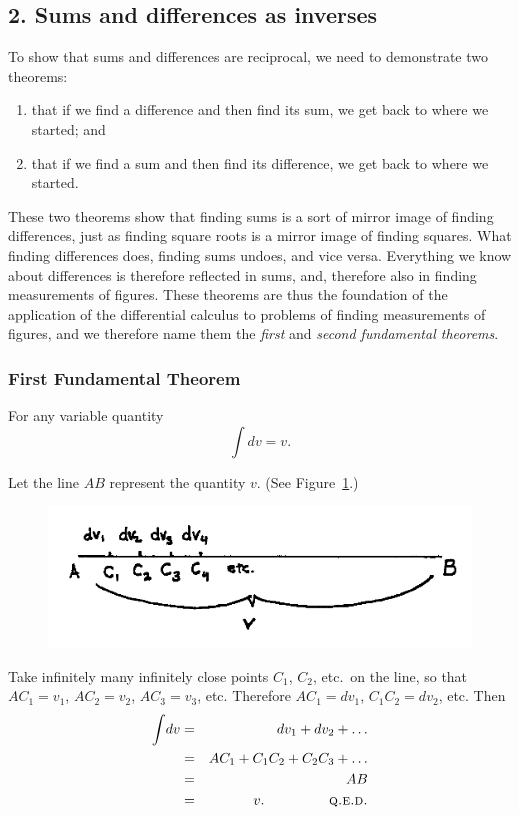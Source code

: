 \documentclass[twoside,openright]{article}
\begin{document}
\subsection*{2. Sums and differences as inverses}

To show that sums and differences are reciprocal, we need to demonstrate two theorems:
\begin{enumerate}
\itemsep0em
\item that if we find a difference and then find its sum, we get back
  to where we started; and
\item that if we find a sum and then find its difference, we get back
  to where we started.
\end{enumerate}
These two theorems show that finding sums is a sort of mirror image of
finding differences, just as finding square roots is a mirror image of
finding squares.  What finding differences does, finding sums undoes,
and vice versa.  Everything we know about differences is therefore
reflected in sums, and, therefore also in finding measurements of
figures.  These theorems are thus the foundation of the application of
the differential calculus to problems of finding measurements of
figures, and we therefore name them the {\em first} and {\em second
  fundamental theorems}.

\subsubsection*{First Fundamental Theorem}
\label{fund1} For any variable quantity
$$\int\!dv = v.$$

Let the line $AB$ represent the quantity $v$. (See Figure~\ref{ffundfig}.)
\begin{figure}[htp]
\begin{center}
\includegraphics[width=.75\textwidth]{fig/Figure37}
\caption{}
\label{ffundfig}
\vspace{-10pt}
\end{center}
\end{figure} Take infinitely many infinitely close points $C_1$,
$C_2$, etc.\ on the line, so that $AC_1 = v_1$, $AC_2 =v_2$,
$AC_3 =v_3$, etc.  Therefore $AC_1 =dv_1$, $C_1C_2 = dv_2$, etc. Then
\begin{eqnarray*}
  \int\!dv & = & dv_1 + dv_2 + \ldots\\
           & = & AC_1 + C_1C_2 + C_2C_3 +\ldots \\
           & = & AB\\
           & = & v. \mbox{\hspace{10ex}  \textsc{q.e.d.}}
\end{eqnarray*}
\end{document}
